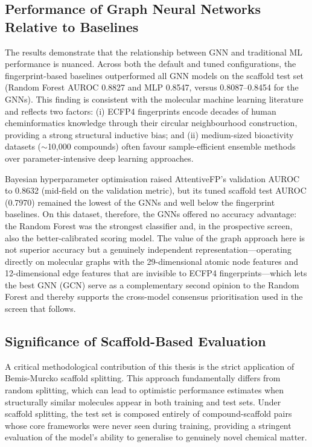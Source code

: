 \subsection{Performance of Graph Neural Networks Relative to Baselines}

The results demonstrate that the relationship between GNN and traditional ML
performance is nuanced. Across both the default and tuned configurations, the
fingerprint-based baselines outperformed all GNN models on the scaffold test set
(Random Forest AUROC 0.8827 and MLP 0.8547, versus 0.8087--0.8454 for the GNNs).
This finding is consistent with the molecular machine learning literature and
reflects two factors: (i) ECFP4 fingerprints encode decades of human cheminformatics
knowledge through their circular neighbourhood construction, providing a strong
structural inductive bias; and (ii) medium-sized bioactivity datasets ($\sim$10,000
compounds) often favour sample-efficient ensemble methods over parameter-intensive
deep learning approaches.

Bayesian hyperparameter optimisation raised AttentiveFP's validation AUROC to
0.8632 (mid-field on the validation metric), but its tuned scaffold test AUROC
(0.7970) remained the lowest of the GNNs and well below the fingerprint baselines. On this dataset, therefore, the GNNs offered no accuracy advantage: the
Random Forest was the strongest classifier and, in the prospective screen, also the
better-calibrated scoring model. The value of the graph approach here is not superior
accuracy but a genuinely independent representation---operating directly on molecular
graphs with the 29-dimensional atomic node features and 12-dimensional edge features
that are invisible to ECFP4 fingerprints---which lets the best GNN (GCN) serve as a
complementary second opinion to the Random Forest and thereby supports the cross-model
consensus prioritisation used in the screen that follows.

\subsection{Significance of Scaffold-Based Evaluation}

A critical methodological contribution of this thesis is the strict application of
Bemis-Murcko scaffold splitting. This approach fundamentally differs from random
splitting, which can lead to optimistic performance estimates when structurally
similar molecules appear in both training and test sets. Under scaffold splitting,
the test set is composed entirely of compound-scaffold pairs whose core frameworks
were never seen during training, providing a stringent evaluation of the model's
ability to generalise to genuinely novel chemical matter.

